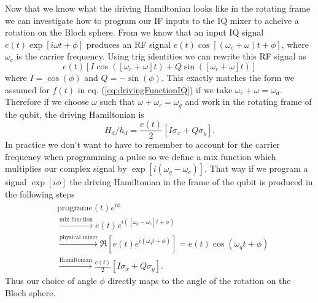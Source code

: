 
Now that we know what the driving Hamiltonian looks like in the rotating frame we can investigate how to program our IF inputs to the IQ mixer to acheive a rotation on the Bloch sphere.
From  we know that an input IQ signal $e(t)\exp\left[i\omega t + \phi\right]$ produces an RF signal $ e(t)\cos\left[(\omega_c+\omega)t + \phi \right]$, where $\omega_c$ is the carrier frequency. Using trig identities we can rewrite this RF signal as \begin{equation}
e(t) \left[ I\cos(\left[\omega_c+\omega\right] t) + Q\sin(\left[\omega_c+\omega\right]t)\right] \nonumber \end{equation}
where $I=\cos(\phi)$ and $Q=-\sin(\phi)$.
This exactly matches the form we assumed for $f(t)$ in eq. (\ref{eq:drivingFunctionIQ}) if we take $\omega_c + \omega = \omega_d$.
Therefore if we choose $\omega$ such that $\omega + \omega_c = \omega_q$ and work in the rotating frame of the qubit, the driving Hamiltonian is \begin{equation}
H_d/h_d = \frac{e(t)}{2}\left[I\sigma_x + Q\sigma_y\right]. \end{equation}
In practice we don't want to have to remember to account for the carrier frequency when programming a pulse so we define a mix function which multiplies our complex signal by $\exp\left[i(\omega_{q} - \omega_c)\right]$.
That way if we program a signal $\exp\left[i\phi\right]$ the driving Hamiltonian in the frame of the qubit is produced in the following steps \begin{align}
&\textrm{program} e(t) e^{i\phi} \nonumber \\
&\stackrel{\textrm{mix function}}{\longrightarrow} e(t) e^{i([\omega_q-\omega_c]t + \phi)} \nonumber \\
&\stackrel{\textrm{physical mixer}}{\longrightarrow} \Re \left[ e(t) e^{i(\omega_q t + \phi)} \right] = e(t) \cos\left(\omega_q t + \phi \right) \nonumber \\
&\stackrel{\textrm{Hamiltonian}}{\longrightarrow} \frac{e(t)}{2}\left[ I \sigma_x + Q \sigma_y \right]. \nonumber
\end{align}
Thus our choice of angle $\phi$ directly maps to the angle of the rotation on the Bloch sphere.


